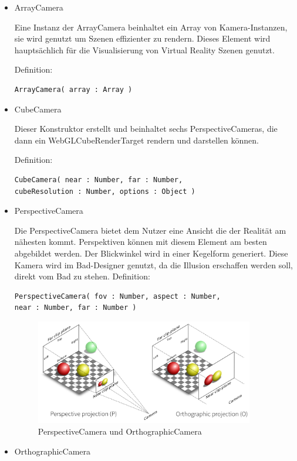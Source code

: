 \begin{itemize}
    \item ArrayCamera 
  
Eine Instanz der ArrayCamera beinhaltet ein Array von Kamera-Instanzen, sie wird genutzt um Szenen effizienter zu rendern. Dieses Element wird hauptsächlich für die Visualisierung von Virtual Reality Szenen genutzt.

Definition:
\begin{lstlisting}
ArrayCamera( array : Array )
\end{lstlisting}
    \item CubeCamera 
  
Dieser Konstruktor erstellt und beinhaltet sechs PerspectiveCameras, die dann ein WebGLCubeRenderTarget \cite{WebGLCubeRenderTarget} rendern und darstellen können.

Definition:
\begin{lstlisting}
CubeCamera( near : Number, far : Number,
cubeResolution : Number, options : Object )
\end{lstlisting}
    \item PerspectiveCamera 
  
Die PerspectiveCamera bietet dem Nutzer eine Ansicht die der Realität am nähesten kommt. Perspektiven können mit diesem Element am besten abgebildet werden. Der Blickwinkel wird in einer Kegelform generiert. Diese Kamera wird im Bad-Designer genutzt, da die Illusion erschaffen werden soll, direkt vom Bad zu stehen. \cite{Camera_Types}
Definition:
\begin{lstlisting}
PerspectiveCamera( fov : Number, aspect : Number,
near : Number, far : Number )
\end{lstlisting}
\newpage
\begin{figure}[h]
    \centering
    \includegraphics[width=0.9\textwidth]{images/orthographicVsPerspective.png}
    \caption{PerspectiveCamera und OrthographicCamera \cite{orthographicVsPerspective}}
    \label{fig:my_label}
\end{figure}
\item OrthographicCamera 
  

\end{itemize}
